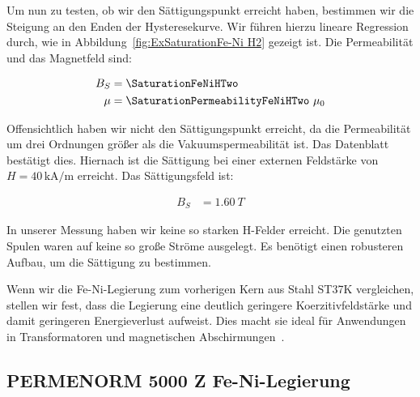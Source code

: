\documentclass[a4paper,10pt,twocolumn]{article}
\begin{document}
    Um nun zu testen, ob wir den Sättigungspunkt erreicht haben, bestimmen wir die Steigung an den Enden der
    Hysteresekurve.
    Wir führen hierzu lineare Regression durch, wie in Abbildung~\ref{fig:ExSaturationFe-Ni H2} gezeigt ist.
    Die Permeabilität und das Magnetfeld sind:

    \begin{align*}
        B_S &= \SaturationFeNiHTwo \\
        \mu &= \SaturationPermeabilityFeNiHTwo \ \mu_0
    \end{align*}

    Offensichtlich haben wir nicht den Sättigungspunkt erreicht, da die Permeabilität um drei Ordnungen größer als
    die Vakuumspermeabilität ist.
    Das Datenblatt bestätigt dies.
    Hiernach ist die Sättigung bei einer externen Feldstärke von $H = 40 \, \text{kA/m}$ erreicht.
    Das Sättigungsfeld ist:

    \begin{align*}
        B_S &= 1.60 \ T
    \end{align*}
%    

    In unserer Messung haben wir keine so starken H-Felder erreicht.
    Die genutzten Spulen waren auf keine so große Ströme ausgelegt.
    Es benötigt einen robusteren Aufbau, um die Sättigung zu bestimmen.

    Wenn wir die Fe-Ni-Legierung zum vorherigen Kern aus Stahl ST37K vergleichen, stellen wir fest, dass die Legierung eine
    deutlich geringere Koerzitivfeldstärke und damit geringeren Energieverlust aufweist.
    Dies macht sie ideal für Anwendungen in Transformatoren und magnetischen Abschirmungen~\cite{feniDatasheet}.

    \subsection{PERMENORM 5000 Z Fe-Ni-Legierung}
\end{document}
